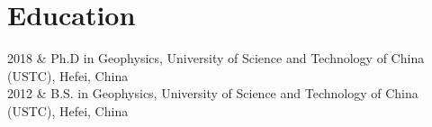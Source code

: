 \section{Education}

\begin{EntriesTable}{0.05}{0.02}{0.93}
2018 & Ph.D in Geophysics, University of Science and Technology of China (USTC), Hefei, China \\
2012 & B.S. in Geophysics, University of Science and Technology of China (USTC), Hefei, China \\
\end{EntriesTable}
